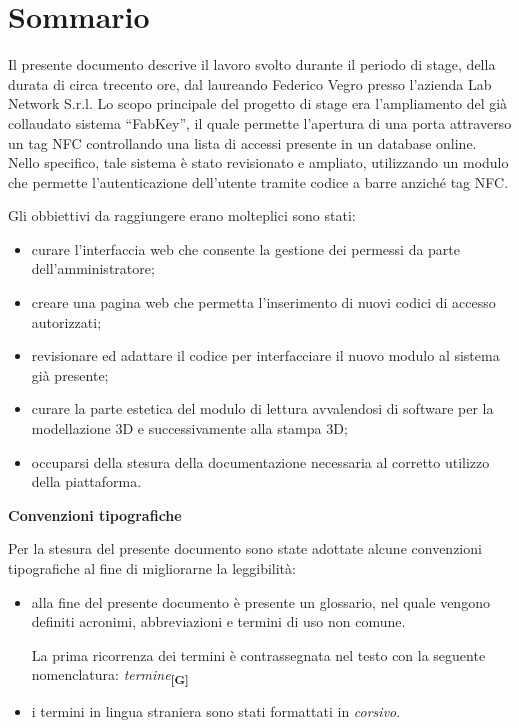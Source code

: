 
\cleardoublepage
{}
{}
\begingroup
\let\clearpage\relax
\let\cleardoublepage\relax
\let\cleardoublepage\relax

\chapter*{Sommario}

Il presente documento descrive il lavoro svolto durante il periodo di stage, della durata di circa trecento ore, dal laureando Federico Vegro presso l'azienda Lab Network S.r.l.
Lo scopo principale del progetto di stage era l'ampliamento del già collaudato sistema ``FabKey'', il quale permette l'apertura di una porta attraverso un tag NFC controllando una lista di accessi presente in un database online. Nello specifico, tale sistema è stato revisionato e ampliato, utilizzando un modulo che permette l'autenticazione dell'utente tramite codice a barre anziché tag NFC.

Gli obbiettivi da raggiungere erano molteplici sono stati:
\begin{itemize}
\item curare l'interfaccia web che consente la gestione dei permessi da parte dell'amministratore;
\item creare una pagina web che permetta l'inserimento di nuovi codici di accesso autorizzati;
\item revisionare ed adattare il codice per interfacciare il nuovo modulo al sistema già presente;
\item curare la parte estetica del modulo di lettura avvalendosi di software per la modellazione 3D e successivamente alla stampa 3D;
\item occuparsi della stesura della documentazione necessaria al corretto utilizzo della piattaforma.
\end{itemize}

\bigskip

\textbf{Convenzioni tipografiche}

\bigskip

Per la stesura del presente documento sono state adottate alcune convenzioni tipografiche al fine di migliorarne la leggibilità:
\begin{itemize}
\item alla fine del presente documento è presente un glossario, nel quale vengono definiti acronimi, abbreviazioni e termini di uso non comune. 

La prima ricorrenza dei termini è contrassegnata nel testo con la seguente nomenclatura: \textit{termine}\textbf{\textsubscript{[G]}}
\item i termini in lingua straniera sono stati formattati in \textit{corsivo}.
\end{itemize}

%
%

\endgroup			

\vfill


